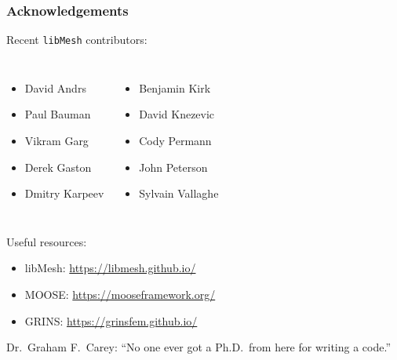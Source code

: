 \documentclass[mathserif]{beamer}
\newcommand{\software}[1]{{\texttt{#1}}}
\newcommand{\libMesh}{\software{libMesh}}
\begin{document}
\begin{frame}
\frametitle{Acknowledgements}

Recent \libMesh{} contributors:
\begin{columns}


\begin{itemize}
\item David Andrs
\item Paul Bauman
\item Vikram Garg
\item Derek Gaston
\item Dmitry Karpeev
\end{itemize}

\begin{itemize}
\item Benjamin Kirk
\item David Knezevic
\item Cody Permann
\item John Peterson
\item Sylvain Vallaghe
\end{itemize}

\end{columns}

\vspace{5mm}

Useful resources:
\begin{itemize}
\item libMesh: \url{https://libmesh.github.io/}
\item MOOSE: \url{https://mooseframework.org/}
\item GRINS: \url{https://grinsfem.github.io/}
\end{itemize}

\vspace{5mm}

Dr.\ Graham F.\ Carey: ``No one ever got a Ph.D.\ from here for writing
a code.''

\end{frame}
\end{document}
